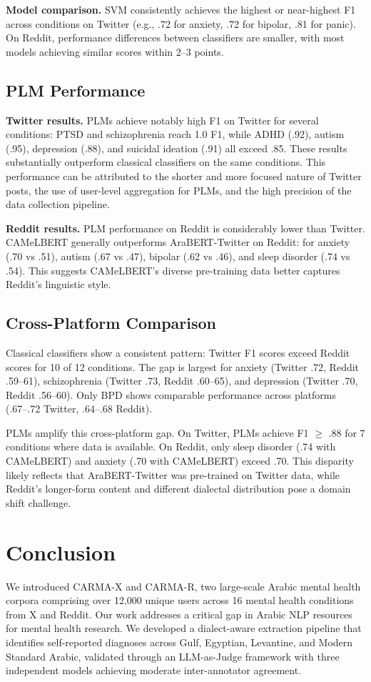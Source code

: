 \documentclass[11pt]{article}
\begin{document}
\textbf{Model comparison.} SVM consistently achieves the highest or near-highest F1 across conditions on Twitter (e.g., .72 for anxiety, .72 for bipolar, .81 for panic). On Reddit, performance differences between classifiers are smaller, with most models achieving similar scores within 2--3 points.

\subsection{PLM Performance}

\textbf{Twitter results.} PLMs achieve notably high F1 on Twitter for several conditions: PTSD and schizophrenia reach 1.0 F1, while ADHD (.92), autism (.95), depression (.88), and suicidal ideation (.91) all exceed .85. These results substantially outperform classical classifiers on the same conditions. This performance can be attributed to the shorter and more focused nature of Twitter posts, the use of user-level aggregation for PLMs, and the high precision of the data collection pipeline.


\textbf{Reddit results.} PLM performance on Reddit is considerably lower than Twitter. CAMeLBERT generally outperforms AraBERT-Twitter on Reddit: for anxiety (.70 vs .51), autism (.67 vs .47), bipolar (.62 vs .46), and sleep disorder (.74 vs .54). This suggests CAMeLBERT's diverse pre-training data better captures Reddit's linguistic style.

\subsection{Cross-Platform Comparison}

Classical classifiers show a consistent pattern: Twitter F1 scores exceed Reddit scores for 10 of 12 conditions. The gap is largest for anxiety (Twitter .72, Reddit .59--61), schizophrenia (Twitter .73, Reddit .60--65), and depression (Twitter .70, Reddit .56--60). Only BPD shows comparable performance across platforms (.67--.72 Twitter, .64--.68 Reddit).

PLMs amplify this cross-platform gap. On Twitter, PLMs achieve F1 $\geq$ .88 for 7 conditions where data is available. On Reddit, only sleep disorder (.74 with CAMeLBERT) and anxiety (.70 with CAMeLBERT) exceed .70. This disparity likely reflects that AraBERT-Twitter was pre-trained on Twitter data, while Reddit's longer-form content and different dialectal distribution pose a domain shift challenge.


\section{Conclusion}
We introduced CARMA-X and CARMA-R, two large-scale Arabic mental health corpora comprising over 12,000 unique users across 16 mental health conditions from X and Reddit. Our work addresses a critical gap in Arabic NLP resources for mental health research. We developed a dialect-aware extraction pipeline that identifies self-reported diagnoses across Gulf, Egyptian, Levantine, and Modern Standard Arabic, validated through an LLM-as-Judge framework with three independent models achieving moderate inter-annotator agreement.
\end{document}
